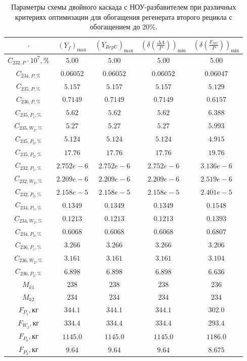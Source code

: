 \begin{table}
    \centering
    \begin{tabular}{|c|cccc|}
        \hline $\cdot$ & $(Y_f)_\text{max}$ & $(Y_{RepU})_\text{max}$ & $(\delta(\frac{\Delta A}{P}))_\text{min}$ & $(\delta(\frac{F_{NU}}{P}))_\text{min}$\\ \hline
    $C_{232,P}\cdot10^{7}, \%$ & $5.00$ & $5.00$ & $5.00$ & $5.00$\\ \hline
    $C_{234,P, \%}$ & $0.06052$ & $0.06052$ & $0.06052$ & $0.06047$\\ \hline
    $C_{235,P, \%}$ & $5.157$ & $5.157$ & $5.157$ & $5.129$\\ \hline
    $C_{236,P, \%}$ & $0.7149$ & $0.7149$ & $0.7149$ & $0.6157$\\ \hline
    $C_{235,P_1, \%}$ & $5.62$ & $5.62$ & $5.62$ & $6.388$\\ \hline
    $C_{235,W_2, \%}$ & $5.27$ & $5.27$ & $5.27$ & $5.993$\\ \hline
    $C_{235,P_0, \%}$ & $5.124$ & $5.124$ & $5.124$ & $4.915$\\ \hline
    $C_{235,P_2, \%}$ & $17.76$ & $17.76$ & $17.76$ & $19.76$\\ \hline
    $C_{232,P_1, \%}$ & $2.752e-6$ & $2.752e-6$ & $2.752e-6$ & $3.136e-6$\\ \hline
    $C_{232,W_2, \%}$ & $2.209e-6$ & $2.209e-6$ & $2.209e-6$ & $2.519e-6$\\ \hline
    $C_{232,P_2, \%}$ & $2.158e-5$ & $2.158e-5$ & $2.158e-5$ & $2.401e-5$\\ \hline
    $C_{234,P_1, \%}$ & $0.1349$ & $0.1349$ & $0.1349$ & $0.1548$\\ \hline
    $C_{234,W_2, \%}$ & $0.1213$ & $0.1213$ & $0.1213$ & $0.1393$\\ \hline
    $C_{234,P_2, \%}$ & $0.6068$ & $0.6068$ & $0.6068$ & $0.6807$\\ \hline
    $C_{236,P_1, \%}$ & $3.266$ & $3.266$ & $3.266$ & $3.206$\\ \hline
    $C_{236,W_2, \%}$ & $3.161$ & $3.161$ & $3.161$ & $3.104$\\ \hline
    $C_{236,P_2, \%}$ & $6.898$ & $6.898$ & $6.898$ & $6.636$\\ \hline
    $M_{k1}$ & $238$ & $238$ & $238$ & $236$\\ \hline
    $M_{k2}$ & $234$ & $234$ & $234$ & $234$\\ \hline
    $F_{P_1}, \text{кг}$ & $344.1$ & $344.1$ & $344.1$ & $302.0$\\ \hline
    $F_{W_2}, \text{кг}$ & $334.4$ & $334.4$ & $334.4$ & $293.4$\\ \hline
    $F_{P_0}, \text{кг}$ & $1145.0$ & $1145.0$ & $1145.0$ & $1186.0$\\ \hline
    $F_{P_2}, \text{кг}$ & $9.64$   & $9.64$ & $9.64$ & $8.675$\\ \hline
    \end{tabular}
\caption{Параметры схемы двойного каскада с НОУ-разбавителем при различных критериях оптимизации для обогащения регенерата второго рецикла с обогащением до 20\%.{\label{2opt2_20}}}
\end{table}









